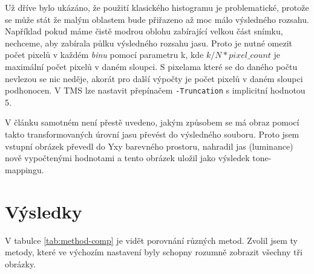 \documentclass[11pt,a4paper,oneside]{article}
\begin{document}
Už dříve bylo ukázáno, že použití klasického histogramu je problematické,
protože se může stát že malým oblastem bude přiřazeno až moc málo výsledného
rozsahu. Například pokud máme čistě modrou oblohu zabírající velkou část snímku,
nechceme, aby zabírala půlku výsledného rozsahu jasu. Proto je nutné
omezit počet pixelů v každém \textit{binu} pomocí parametru k, kde
$k/N*pixel\_count$ je maximální počet pixelů v daném sloupci. S pixelama které
se do daného počtu nevlezou se nic neděje, akorát pro další výpočty je počet
pixelů v daném sloupci podhonocen. V TMS lze nastavit přepínačem
\texttt{-Truncation} s implicitní hodnotou 5.

V článku samotném není přestě uvedeno, jakým způsobem se má obraz pomocí takto
transformovaných úrovní jasu převést do výsledného souboru. Proto jsem vstupní
obrázek převedl do Yxy barevného prostoru, nahradil jas (luminance) nově
vypočtenými hodnotami a tento obrázek uložil jako výsledek tone-mappingu.

\section{Výsledky}


V tabulce \ref{tab:method-comp} je vidět porovnání různých metod. Zvolil jsem ty
metody, které ve výchozím nastavení byly schopny rozumně zobrazit všechny tři
obrázky.
\end{document}
